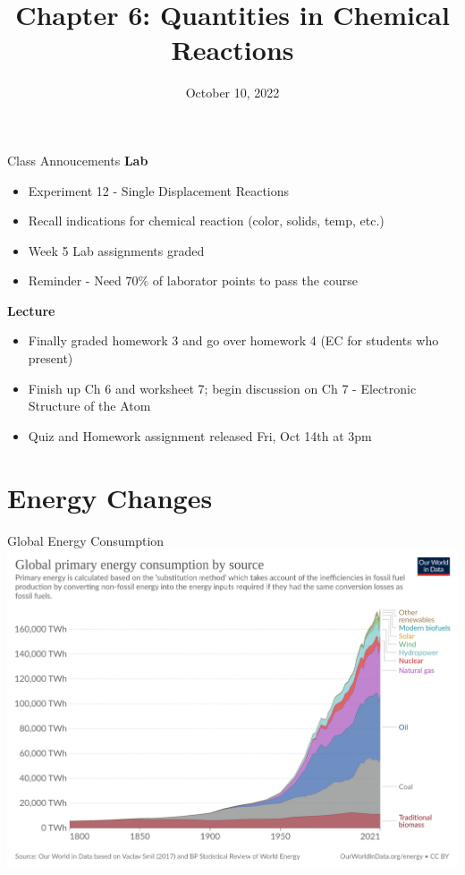 \documentclass[11pt]{beamer}
\title{Chapter 6: Quantities in Chemical Reactions}
\institute{Chemistry Department, Cypress College}
\date{October 10, 2022}
\begin{document}
\begin{frame}
  \titlepage
\end{frame}

\begin{frame}{Class Annoucements}
  \textbf{Lab}
  \begin{itemize}
  \item Experiment 12 - Single Displacement Reactions
  \item Recall indications for chemical reaction (color, solids,
    temp, etc.)
  \item Week 5 Lab assignments graded
  \item Reminder - Need $70\%$ of laborator points to pass the course
  \end{itemize}
  
  \textbf{Lecture}
  \begin{itemize}
  \item Finally graded homework 3 and go over homework 4 (EC for
    students who present)
  \item Finish up Ch 6 and worksheet 7; begin discussion on Ch 7
    - Electronic Structure of the Atom
  \item Quiz and Homework assignment released Fri, Oct 14th at 3pm
  \end{itemize}
\end{frame}

\section{Energy Changes}

\begin{frame}{Global Energy Consumption}
  \centering
  \includegraphics[width=\linewidth]{global_energy}
\end{frame}
\end{document}
